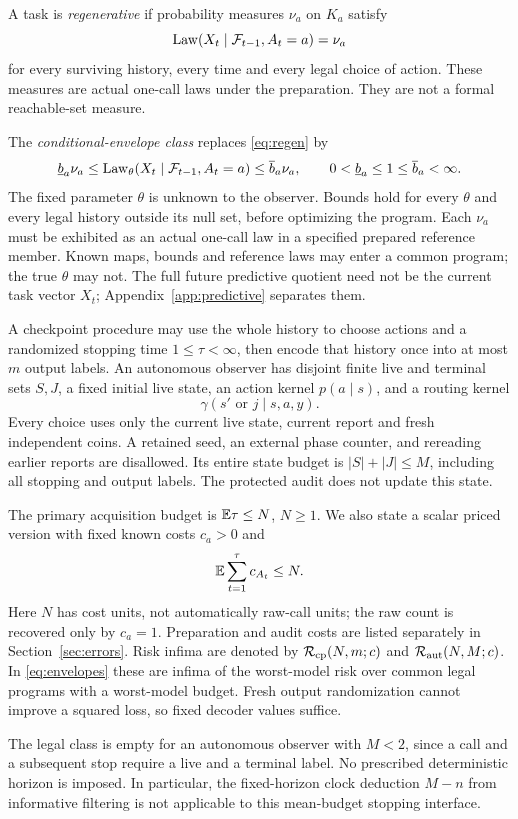 \begin{definition}\label{def:classes}
A task is \emph{regenerative} if probability measures $\nu_a$ on $K_a$ satisfy
\begin{equation}\label{eq:regen}
 \operatorname{Law}(X_t\mid\mathcal F_{t-1},A_t=a)=\nu_a
\end{equation}
for every surviving history, every time and every legal choice of action. These measures are actual one-call laws under the preparation. They are not a formal reachable-set measure.

The \emph{conditional-envelope class} replaces \eqref{eq:regen} by
\begin{equation}\label{eq:envelopes}
 \underline b_a\nu_a\le
 \operatorname{Law}_\theta(X_t\mid\mathcal F_{t-1},A_t=a)
 \le\overline b_a\nu_a,
 \qquad 0<\underline b_a\le1\le\overline b_a<\infty.
\end{equation}
The fixed parameter $\theta$ is unknown to the observer. Bounds hold for every $\theta$ and every legal history outside its null set, before optimizing the program. Each $\nu_a$ must be exhibited as an actual one-call law in a specified prepared reference member. Known maps, bounds and reference laws may enter a common program; the true $\theta$ may not. The full future predictive quotient need not be the current task vector $X_t$; Appendix~\ref{app:predictive} separates them.
\end{definition}

A checkpoint procedure may use the whole history to choose actions and a randomized stopping time $1\le\tau<\infty$, then encode that history once into at most $m$ output labels. An autonomous observer has disjoint finite live and terminal sets $S,J$, a fixed initial live state, an action kernel $p(a\mid s)$, and a routing kernel
\[
 \gamma(s'\text{ or }j\mid s,a,y).
\]
Every choice uses only the current live state, current report and fresh independent coins. A retained seed, an external phase counter, and rereading earlier reports are disallowed. Its entire state budget is $|S|+|J|\le M$, including all stopping and output labels. The protected audit does not update this state.

The primary acquisition budget is $\mathbb E\tau\le N$, $N\ge1$. We also state a scalar priced version with fixed known costs $c_a>0$ and
\begin{equation}\label{eq:cost}
 \mathbb E\sum_{t=1}^{\tau}c_{A_t}\le N.
\end{equation}
Here $N$ has cost units, not automatically raw-call units; the raw count is recovered only by $c_a=1$. Preparation and audit costs are listed separately in Section~\ref{sec:errors}. Risk infima are denoted by $\mathcal R_{\mathrm{cp}}(N,m;c)$ and $\mathcal R_{\mathrm{aut}}(N,M;c)$. In \eqref{eq:envelopes} these are infima of the worst-model risk over common legal programs with a worst-model budget. Fresh output randomization cannot improve a squared loss, so fixed decoder values suffice.

The legal class is empty for an autonomous observer with $M<2$, since a call and a subsequent stop require a live and a terminal label. No prescribed deterministic horizon is imposed. In particular, the fixed-horizon clock deduction $M-n$ from informative filtering is not applicable to this mean-budget stopping interface.
